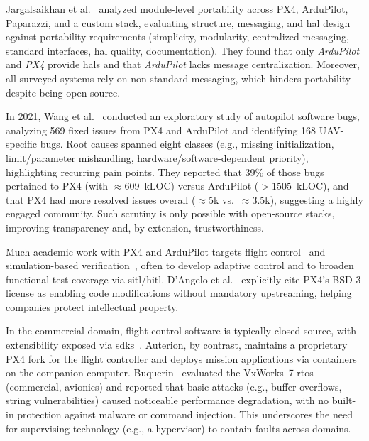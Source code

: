 Jargalsaikhan et al.~\cite{jargalsaikhan2022architectural} analyzed module-level
portability across PX4, ArduPilot, Paparazzi, and a custom stack, evaluating
structure, messaging, and \gls{hal} design against portability requirements
(simplicity, modularity, centralized messaging, standard interfaces, \gls{hal}
quality, documentation). They found that only \emph{ArduPilot} and \emph{PX4}
provide \glspl{hal} and that \emph{ArduPilot} lacks message
centralization. Moreover, all surveyed systems rely on non-standard messaging,
which hinders portability despite being open source.

In 2021, Wang et al.~\cite{wang_exploratory_2021} conducted an exploratory study
of autopilot software bugs, analyzing 569 fixed issues from PX4 and ArduPilot
and identifying 168 UAV-specific bugs. Root causes spanned eight classes (e.g.,
missing initialization, limit/parameter mishandling, hardware/software-dependent
priority), highlighting recurring pain points. They reported that 39\% of those
bugs pertained to PX4 (with \(\approx\)609~kLOC) versus ArduPilot (\(>1505\)~kLOC), and
that PX4 had more resolved issues overall (\(\approx\)5k vs.\ \(\approx\)3.5k), suggesting
a highly engaged community. Such scrutiny is only possible with open-source
stacks, improving transparency and, by extension, trustworthiness.

Much academic work with PX4 and ArduPilot targets flight
control~\cite{li_embedding_2022,li_plug-and-play_2021,baldi_ardupilot-based_2022,dangelo_efficient_2024}
and simulation-based
verification~\cite{baldi_ardupilot-based_2022,dang_nguyen_vision-based_2019,dai_rflysim_2021},
often to develop adaptive control and to broaden functional test coverage via
\gls{sitl}/\gls{hitl}.
D'Angelo et al.~\cite{dangelo_efficient_2024} explicitly cite PX4's BSD-3
license as enabling code modifications without mandatory upstreaming, helping
companies protect intellectual property.
%

In the commercial domain, flight-control software is typically closed-source,
with extensibility exposed via \glspl{sdk}~\cite{parrot-sdk}. Auterion, by
contrast, maintains a proprietary PX4 fork for the flight controller and deploys mission applications via containers on the companion computer. %
%
Buquerin~\cite{buquerin2018security} evaluated the
VxWorks~7 \gls{rtos} (commercial, avionics) and reported that basic attacks (e.g., buffer overflows, string vulnerabilities) caused noticeable performance degradation, with no built-in protection against malware or command injection.
This underscores the need for supervising technology (e.g., a hypervisor) to contain faults across domains.

